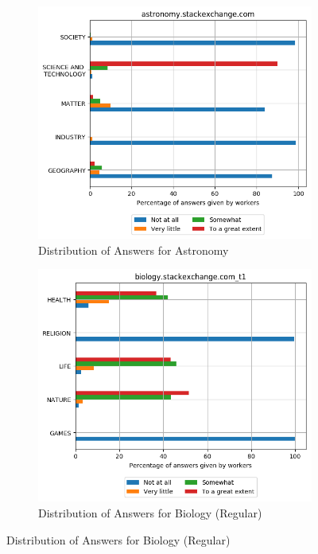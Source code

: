 

 \begin{figure}[H]
    \centering
    \begin{subfigure}{0.5\textwidth}
    \centering
        \includegraphics[width=1\linewidth]{imgs/crowd-results/astronomy_stackexchange_com}
        \caption{Distribution of Answers for Astronomy}
        \label{fig:crowd-results-astronomy}
    \end{subfigure}%
    \begin{subfigure}{0.5\textwidth}
    \centering
        \includegraphics[width=1\linewidth]{imgs/crowd-results/biology_stackexchange_com_t1}
        \caption{Distribution of Answers for Biology (Regular)}
        \label{fig:crowd-results-biology-1}
    \end{subfigure}
 

\end{figure}
